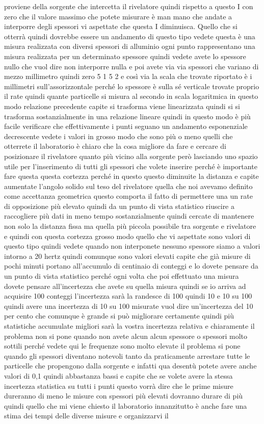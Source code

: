 proviene della sorgente che intercetta il rivelatore quindi rispetto a questo I con zero che il valore massimo che potete misurare è man mano che andate a interporre degli spessori vi aspettate che questa I diminuisca. Quello che si otterrà quindi dovrebbe essere un andamento di questo tipo vedete questa è una misura realizzata con diversi spessori di alluminio ogni punto rappresentano una misura realizzata per un determinato spessore quindi vedete avete lo spessore nullo che vuol dire non interporre nulla e poi avete via via spessori che variano di mezzo millimetro quindi zero 5 1 5 2 e così via la scala che trovate riportato è i millimetri sull'assorizzontale perché lo spessore è sulla sé verticale trovate proprio il rate quindi quante particelle si misura al secondo in scala logaritmica in questo modo relazione precedente capite si trasforma viene linearizzata quindi si si trasforma sostanzialmente in una relazione lineare quindi in questo modo è più facile verificare che effettivamente i punti seguano un andamento esponenziale decrescente vedete i valori in grosso modo che sono più o meno quelli che otterrete il laboratorio è chiaro che la cosa migliore da fare e cercare di posizionare il rivelatore quanto più vicino alla sorgente però lasciando uno spazio utile per l'inserimento di tutti gli spessori che volete inserire perché è importante fare questa questa cortezza perché in questo questo diminuite la distanza e capite aumentate l'angolo solido sul teso del rivelatore quella che noi avevamo definito come accettanza geometrica questo comporta il fatto di permettere una un rate di opposizione più elevato quindi da un punto di vista statistico riuscire a raccogliere più dati in meno tempo sostanzialmente quindi cercate di mantenere non solo la distanza fissa ma quella più piccola possibile tra sorgente e rivelatore e quindi con questa cortezza grosso modo quello che vi aspettate sono valori di questo tipo quindi vedete quando non interponete nessuno spessore siamo a valori intorno a 20 hertz quindi comunque sono valori elevati capite che già misure di pochi minuti portano all'accumulo di centinaio di conteggi e lo dovete pensare da un punto di vista statistico perché ogni volta che poi effettuato una misura dovete pensare all'incertezza che avete su quella misura quindi se io arriva ad acquisire 100 conteggi l'incertezza sarà la randesce di 100 quindi 10 e 10 su 100 quindi avere una incertezza di 10 su 100 misurate vuol dire un'incertezza del 10 per cento che comunque è grande si può migliorare certamente quindi più statistiche accumulate migliori sarà la vostra incertezza relativa e chiaramente il problema non si pone quando non avete alcun alcun spessore o spessori molto sottili perché vedete qui le frequenze sono molto elevate il problema si pone quando gli spessori diventano notevoli tanto da praticamente arrestare tutte le particelle che propengono dalla sorgente e infatti qua desentù potete avere anche valori di 0,1 quindi abbastanza bassi e capite che se volete avere la stessa incertezza statistica su tutti i punti questo vorrà dire che le prime misure dureranno di meno le misure con spessori più elevati dovranno durare di più quindi quello che mi viene chiesto il laboratorio innanzitutto è anche fare una stima dei tempi delle diverse misure e organizzarvi il 
